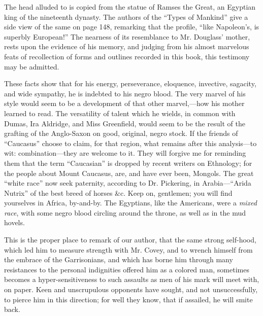 The head alluded to is copied from the statue of Ramses the Great, an
Egyptian king of the nineteenth dynasty. The authors of the ``Types of
Mankind'' give a side view of the same on page 148, remarking that the
profile, ``like Napoleon's, is superbly European!'' The nearness of its
resemblance to Mr. Douglass' mother, rests upon the evidence of his
memory, and judging from his almost marvelous feats of recollection of
forms and outlines recorded in this book, this testimony may be
admitted.

These facts show that for his energy, perseverance, eloquence,
invective, sagacity, and wide sympathy, he is indebted to his negro
blood. The very marvel of his style would seem to be a development of
that other marvel,---how his mother learned to read. The versatility of
talent which he wields, in common with Dumas, Ira Aldridge, and Miss
Greenfield, would seem to be the result of the grafting of the
Anglo-Saxon on good, original, negro stock. If the {}friends of
``Caucasus'' choose to claim, for that region, what remains after this
analysis---to wit: combination---they are welcome to it. They will
forgive me for reminding them that the term ``Caucasian'' is dropped by
recent writers on Ethnology; for the people about Mount Caucasus, are,
and have ever been, Mongols. The great ``white race'' now seek
paternity, according to Dr. Pickering, in Arabia---``Arida Nutrix'' of
the best breed of horses \&c. Keep on, gentlemen; you will find
yourselves in Africa, by-and-by. The Egyptians, like the Americans, were
a \emph{mixed race}, with some negro blood circling around the throne,
as well as in the mud hovels.

This is the proper place to remark of our author, that the same strong
self-hood, which led him to measure strength with Mr. Covey, and to
wrench himself from the embrace of the Garrisonians, and which has borne
him through many resistances to the personal indignities offered him as
a colored man, sometimes becomes a hyper-sensitiveness to such assaults
as men of his mark will meet with, on paper. Keen and unscrupulous
opponents have sought, and not unsuccessfully, to pierce him in this
direction; for well they know, that if assailed, he will smite back.

